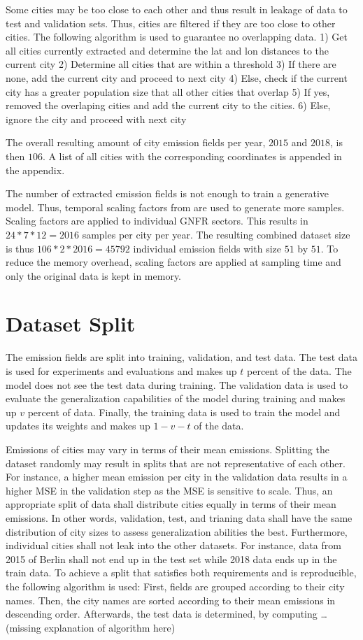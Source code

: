 Some cities may be too close to each other and thus result in leakage of data to test and validation sets.
Thus, cities are filtered if they are too close to other cities.
The following algorithm is used to guarantee no overlapping data.
1) Get all cities currently extracted and determine the lat and lon distances to the current city
2) Determine all cities that are within a threshold
3) If there are none, add the current city and proceed to next city
4) Else, check if the current city has a greater population size that all other cities that overlap
5) If yes, removed the overlaping cities and add the current city to the cities.
6) Else, ignore the city and proceed with next city

The overall resulting amount of city emission fields per year, $2015$ and $2018$, is then $106$.
A list of all cities with the corresponding coordinates is appended in the appendix.

The number of extracted emission fields is not enough to train a generative model.
Thus, temporal scaling factors from \parencite{ScalingFactors} are used to generate more samples.
Scaling factors are applied to individual GNFR sectors.
This results in $24 * 7 * 12 = 2016$ samples per city per year.
The resulting combined dataset size is thus $106 * 2 * 2016 = 45792$ individual emission fields with size $51$ by $51$.
To reduce the memory overhead, scaling factors are applied at sampling time and only the original data is kept in memory.

\section{Dataset Split}
The emission fields are split into training, validation, and test data.
The test data is used for experiments and evaluations and makes up $t$ percent of the data.
The model does not see the test data during training.
The validation data is used to evaluate the generalization capabilities of the model during training and makes up $v$ percent of data.
Finally, the training data is used to train the model and updates its weights and makes up $1 - v - t$ of the data.

Emissions of cities may vary in terms of their mean emissions.
Splitting the dataset randomly may result in splits that are not representative of each other.
For instance, a higher mean emission per city in the validation data results in a higher MSE in the validation step as the MSE is sensitive to scale.
Thus, an appropriate split of data shall distribute cities equally in terms of their mean emissions.
In other words, validation, test, and trianing data shall have the same distribution of city sizes to assess generalization abilities the best. 
Furthermore, individual cities shall not leak into the other datasets.
For instance, data from 2015 of Berlin shall not end up in the test set while 2018 data ends up in the train data.
To achieve a split that satisfies both requirements and is reproducible, the following algorithm is used:
First, fields are grouped according to their city names.
Then, the city names are sorted according to their mean emissions in descending order.
Afterwards, the test data is determined, by computing \dots (missing explanation of algorithm here)

